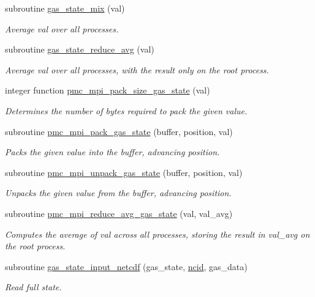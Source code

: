 \begin{DoxyCompactItemize}
subroutine \mbox{\hyperlink{namespacepmc__gas__state_a119c0276d5da30938468361b975dad19}{gas\+\_\+state\+\_\+mix}} (val)
\begin{DoxyCompactList}\small\item\em Average val over all processes. \end{DoxyCompactList}\item 
subroutine \mbox{\hyperlink{namespacepmc__gas__state_a8423bef411d25375dfd0b897f38f117b}{gas\+\_\+state\+\_\+reduce\+\_\+avg}} (val)
\begin{DoxyCompactList}\small\item\em Average val over all processes, with the result only on the root process. \end{DoxyCompactList}\item 
integer function \mbox{\hyperlink{namespacepmc__gas__state_a2c2f0e95ffd10c3821f774e371d54d37}{pmc\+\_\+mpi\+\_\+pack\+\_\+size\+\_\+gas\+\_\+state}} (val)
\begin{DoxyCompactList}\small\item\em Determines the number of bytes required to pack the given value. \end{DoxyCompactList}\item 
subroutine \mbox{\hyperlink{namespacepmc__gas__state_a4bb38e6e0dabd7944df3a2ce21020b92}{pmc\+\_\+mpi\+\_\+pack\+\_\+gas\+\_\+state}} (buffer, position, val)
\begin{DoxyCompactList}\small\item\em Packs the given value into the buffer, advancing position. \end{DoxyCompactList}\item 
subroutine \mbox{\hyperlink{namespacepmc__gas__state_a1b00ba3d007dfa64c0855d8446b414ff}{pmc\+\_\+mpi\+\_\+unpack\+\_\+gas\+\_\+state}} (buffer, position, val)
\begin{DoxyCompactList}\small\item\em Unpacks the given value from the buffer, advancing position. \end{DoxyCompactList}\item 
subroutine \mbox{\hyperlink{namespacepmc__gas__state_abd055facc753ab5852638928dfc1f7eb}{pmc\+\_\+mpi\+\_\+reduce\+\_\+avg\+\_\+gas\+\_\+state}} (val, val\+\_\+avg)
\begin{DoxyCompactList}\small\item\em Computes the average of val across all processes, storing the result in val\+\_\+avg on the root process. \end{DoxyCompactList}\item 
subroutine \mbox{\hyperlink{namespacepmc__gas__state_a1d5cd181f15a8489399a542e0ab98810}{gas\+\_\+state\+\_\+input\+\_\+netcdf}} (gas\+\_\+state, \mbox{\hyperlink{fractal_8_f90_a4e89f3f850921ff84a6dfce8b166ad50}{ncid}}, gas\+\_\+data)
\begin{DoxyCompactList}\small\item\em Read full state. \end{DoxyCompactList}\end{DoxyCompactItemize}


